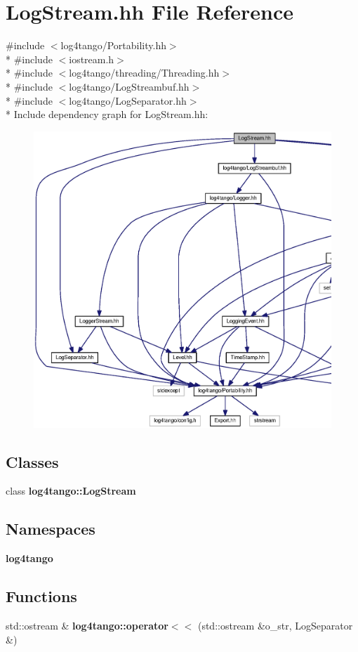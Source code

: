 \section{Log\-Stream.\-hh File Reference}
\label{LogStream_8hh}
{\ttfamily \#include $<$log4tango/\-Portability.\-hh$>$}\\*
{\ttfamily \#include $<$iostream.\-h$>$}\\*
{\ttfamily \#include $<$log4tango/threading/\-Threading.\-hh$>$}\\*
{\ttfamily \#include $<$log4tango/\-Log\-Streambuf.\-hh$>$}\\*
{\ttfamily \#include $<$log4tango/\-Log\-Separator.\-hh$>$}\\*
Include dependency graph for Log\-Stream.\-hh\-:
\nopagebreak
\begin{figure}[H]
\begin{center}
\leavevmode
\includegraphics[width=350pt]{d6/dc1/LogStream_8hh__incl}
\end{center}
\end{figure}
\subsection*{Classes}
\begin{DoxyCompactItemize}
\item 
class {\bf log4tango\-::\-Log\-Stream}
\end{DoxyCompactItemize}
\subsection*{Namespaces}
\begin{DoxyCompactItemize}
\item 
{\bf log4tango}
\end{DoxyCompactItemize}
\subsection*{Functions}
\begin{DoxyCompactItemize}
\item 
std\-::ostream \& {\bf log4tango\-::operator$<$$<$} (std\-::ostream \&o\-\_\-str, Log\-Separator \&)
\end{DoxyCompactItemize}
